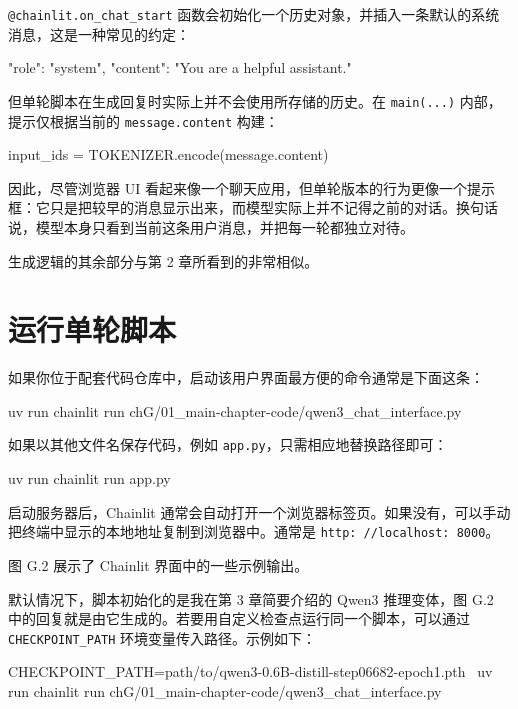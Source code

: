 \texttt{@chainlit.on\_chat\_start} 函数会初始化一个历史对象，并插入一条默认的系统消息，这是一种常见的约定：

\begin{codebox}
{"role": "system", "content": "You are a helpful assistant."}
\end{codebox}

但单轮脚本在生成回复时实际上并不会使用所存储的历史。在 \texttt{main(...)} 内部，提示仅根据当前的 \texttt{message.content} 构建：

\begin{codebox}
input_ids = TOKENIZER.encode(message.content)
\end{codebox}

因此，尽管浏览器 UI 看起来像一个聊天应用，但单轮版本的行为更像一个提示框：它只是把较早的消息显示出来，而模型实际上并不记得之前的对话。换句话说，模型本身只看到当前这条用户消息，并把每一轮都独立对待。

生成逻辑的其余部分与第 2 章所看到的非常相似。

\section{运行单轮脚本}

如果你位于配套代码仓库中，启动该用户界面最方便的命令通常是下面这条：

\begin{codebox}
uv run chainlit run chG/01_main-chapter-code/qwen3_chat_interface.py
\end{codebox}

如果以其他文件名保存代码，例如 \texttt{app.py}，只需相应地替换路径即可：

\begin{codebox}
uv run chainlit run app.py
\end{codebox}

启动服务器后，Chainlit 通常会自动打开一个浏览器标签页。如果没有，可以手动把终端中显示的本地地址复制到浏览器中。通常是 \texttt{http: //localhost: 8000}。

图 G.2 展示了 Chainlit 界面中的一些示例输出。


默认情况下，脚本初始化的是我在第 3 章简要介绍的 Qwen3 推理变体，图 G.2 中的回复就是由它生成的。若要用自定义检查点运行同一个脚本，可以通过 \texttt{CHECKPOINT\_PATH} 环境变量传入路径。示例如下：

\begin{codebox}
CHECKPOINT_PATH=path/to/qwen3-0.6B-distill-step06682-epoch1.pth \
uv run chainlit run chG/01_main-chapter-code/qwen3_chat_interface.py
\end{codebox}

